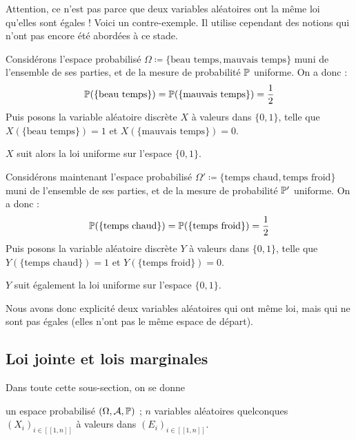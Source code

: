 \documentclass[../integ-proba.tex]{subfiles}
\begin{document}
    \begin{rem}
        Attention, ce n'est pas parce que deux variables aléatoires ont la même loi qu'elles sont égales !
        Voici un contre-exemple.
        Il utilise cependant des notions qui n'ont pas encore été abordées à ce stade.

        Considérons l'espace probabilisé $\Omega \coloneqq \{\text{beau temps}, \text{mauvais temps}\}$ muni de l'ensemble de ses parties, et de la mesure de probabilité $\mathbb{P}$ uniforme.
        On a donc :
        \begin{displaymath}
            \mathbb{P}(\{\text{beau temps}\}) = \mathbb{P}(\{\text{mauvais temps}\}) = \frac{1}{2}
        \end{displaymath}
        Puis posons la variable aléatoire discrète $X$ à valeurs dans $\{0,1\}$, telle que $X(\{\text{beau temps}\})=1$ et $X(\{\text{mauvais temps}\})=0$.

        $X$ suit alors la loi uniforme sur l'espace $\{0,1\}$.

        Considérons maintenant l'espace probabilisé $\Omega' \coloneqq \{\text{temps chaud}, \text{temps froid}\}$ muni de l'ensemble de ses parties, et de la mesure de probabilité $\mathbb{P}'$ uniforme.
        On a donc :
        \begin{displaymath}
            \mathbb{P}(\{\text{temps chaud}\}) = \mathbb{P}(\{\text{temps froid}\}) = \frac{1}{2}
        \end{displaymath}
        Puis posons la variable aléatoire discrète $Y$ à valeurs dans $\{0,1\}$, telle que $Y(\{\text{temps chaud}\})=1$ et $Y(\{\text{temps froid}\})=0$.

        $Y$ suit également la loi uniforme sur l'espace $\{0,1\}$.

        Nous avons donc explicité deux variables aléatoires qui ont même loi, mais qui ne sont pas égales (elles n'ont pas le même espace de départ).
    \end{rem}

    \subsection{Loi jointe et lois marginales}
    Dans toute cette sous-section, on se donne
    \begin{itemize}
        \itemb un espace probabilisé $\left( \Omega, \mathcal{A}, \mathbb{P} \right)$ ;
        \itemb $n$ variables aléatoires quelconques $\left( X_i \right)_{i \in [\![1, n]\!]}$ à valeurs dans $\left( E_i \right)_{i \in [\![1, n]\!]}$.
    \end{itemize}
\end{document}
